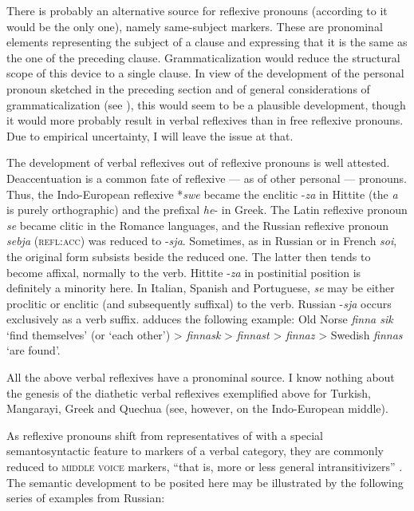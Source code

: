 There is probably an alternative source for reflexive pronouns (according to \citet[248--266]{Faltz1977} it would be the only one), namely same-subject markers. These are pronominal elements representing the subject of a clause and expressing that it is the same as the one of the preceding clause. Grammaticalization would reduce the structural scope of this device to a single clause. In view of the development of the personal pronoun sketched in the preceding section and of general considerations of grammaticalization (see ), this would seem to be a plausible development, though it would more probably result in verbal reflexives than in free reflexive pronouns. Due to empirical uncertainty, I will leave the issue at that.

The development of verbal reflexives out of reflexive pronouns is well attested. Deaccentuation is a common fate of reflexive — as of other personal — pronouns. Thus, the Indo-European reflexive *\textit{swe} became the enclitic -\textit{za} in Hittite (the \textit{a} is purely orthographic) and the prefixal \textit{he}{}- in Greek. The Latin reflexive pronoun \textit{se} became clitic in the Romance languages, and the Russian reflexive pronoun \textit{sebja} (\textsc{refl:acc}) was reduced to -\textit{sja}. Sometimes, as in Russian or in French \textit{soi}, the original form subsists beside the reduced one. The latter then tends to become affixal, normally to the verb. Hittite -\textit{za} in postinitial position is definitely a minority here. In Italian, Spanish and Portuguese, \textit{se} may be either proclitic or enclitic (and subsequently suffixal) to the verb. Russian -\textit{sja} occurs exclusively as a verb suffix. \citet[377]{Jespersen1922} adduces the following example: Old Norse \textit{finna sik} ‘find themselves’ (or ‘each other’) {\textgreater} \textit{finnask} {\textgreater} \textit{finnast} {\textgreater} \textit{finnaz} {\textgreater} Swedish \textit{finnas} ‘are found’.

All the above verbal reflexives have a pronominal source. I know nothing about the genesis of the diathetic verbal reflexives exemplified above for Turkish, Mangarayi, Greek and Quechua (see, however, \citealt[305--309]{Szemerényi1970} on the Indo-European middle).

As reflexive pronouns shift from representatives of \nps with a special semantosyntactic feature to markers of a verbal category, they are commonly reduced to \textsc{middle voice} markers, “that is, more or less general intransitivizers” \citep[268f]{Faltz1977}. The semantic development to be posited here may be illustrated by the following series of examples from Russian:

